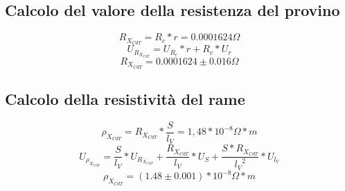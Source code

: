 \documentclass[a4paper]{article}
\begin{document}
\subsection{Calcolo del valore della resistenza del provino}
\begin{Large} 
	\begin{equation}
		R_{X_{CdT}} = R_c* r = 0.0001624 \Omega
	 \end{equation}
	 \begin{equation}
		U_{R_{X_{CdT}}} = U_{R_c}*r+R_c*U_r
	 \end{equation}
	 \begin{equation}
		R_{X_{CdT}} = 0.0001624\pm 0.016 \Omega
	 \end{equation}
\end{Large}

\subsection{Calcolo della resistività del rame}
\begin{Large} 
	\begin{equation}
		\rho_{X_{CdT}} = R_{X_{CdT}}*\frac{S}{l_V} = 1,48*10^{-8} \Omega*m
	 \end{equation}
	 \begin{equation}
		U_{\rho_{X_{CdT}}} = \frac{S}{l_V}*U_{R_{X_{CdT}}}+\frac{R_{X_{CdT}}}{l_V}*U_S+\frac{S*R_{X_{CdT}}}{{l_V}^2}*U_{l_V}
	 \end{equation}
	 \begin{equation}
		\rho_{X_{CdT}} = (1.48\pm 0.001)*10^{-8} \Omega*m
	 \end{equation}
\end{Large}
\end{document}
